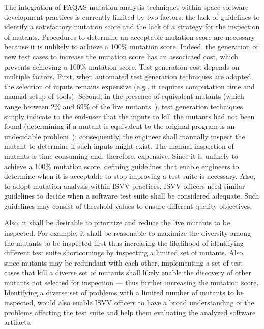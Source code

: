 The integration of FAQAS mutation analysis techniques within space software development practices is currently limited by two factors: the lack of guidelines to identify a satisfactory mutation score and the lack of a strategy for the inspection of mutants. Procedures to determine an acceptable mutation score are necessary because it is unlikely to achieve a 100\% mutation score. Indeed, the generation of new test cases to increase the mutation score has an associated cost, which prevents achieving a 100\% mutation score. Test generation cost depends on multiple factors. First, when automated test generation techniques are adopted, the selection of inputs remains expensive (e.g., it requires computation time and manual setup of tools). Second, in the presence of equivalent mutants (which range between 2\% and 69\% of the live mutants~\cite{Oscar:MASS:TSE}), test generation techniques simply indicate to the end-user that the inputs to kill the mutants had not been found (determining if a mutant is equivalent to the original program is an undecidable problem~\cite{papadakis2019mutation}); consequently, the engineer shall manually inspect the mutant to determine if such inputs might exist. The manual inspection of mutants is time-consuming and, therefore, expensive. Since it is unlikely to achieve a 100\% mutation score, defining guidelines that enable engineers to determine when it is acceptable to stop improving a test suite is necessary. Also, to adopt mutation analysis within ISVV practices, ISVV officers need similar guidelines to decide when a software test suite shall be considered adequate. Such guidelines may consist of threshold values to ensure different quality objectives. 

Also, it shall be desirable to prioritize and reduce the live mutants to be inspected. For example, it shall be reasonable to maximize the diversity among the mutants to be inspected first thus increasing the likelihood of identifying different test suite shortcomings by inspecting a limited set of mutants. Also, since mutants may be redundant with each other, implementing a set of test cases that kill a diverse set of mutants shall likely enable the discovery of other mutants not selected for inspection --- thus further increasing the mutation score. Identifying a diverse set of problems with a limited number of mutants to be inspected, would also enable ISVV officers to have a broad understanding of the problems affecting the test suite and help them evaluating the analyzed software artifacts.

